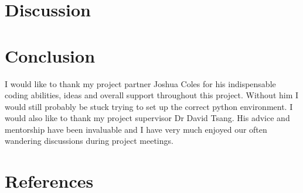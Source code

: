 \documentclass[10pt]{iopart}
\begin{document}
\section{Discussion}
\section{Conclusion}
\ack
I would like to thank my project partner Joshua Coles for his indispensable coding abilities, ideas and overall support throughout this project. Without him I would still probably be stuck trying to set up the correct python environment. I would also like to thank my project supervisor Dr David Tsang. His advice and mentorship have been invaluable and I have very much enjoyed our often wandering discussions during project meetings. 
\section*{References}


\end{document}
